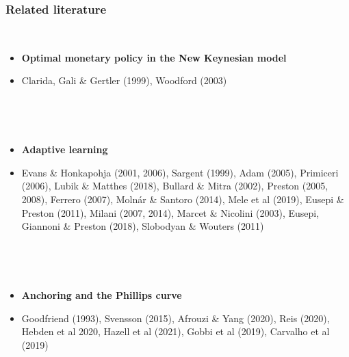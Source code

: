\documentclass[10pt]{beamer}
\begin{document}
\begin{frame}
	\frametitle{Related literature}

\

	\begin{itemize}
		\item \textbf{Optimal monetary policy in the New Keynesian model}
		\item[] Clarida, Gali \& Gertler (1999), Woodford (2003)
		
		\
		
		\
		
		\item \textbf{Adaptive learning}
		\item[] Evans \& Honkapohja (2001, 2006), Sargent (1999), Adam (2005), Primiceri (2006), Lubik \& Matthes (2018), Bullard \& Mitra (2002), Preston (2005, 2008), Ferrero (2007), Moln\'ar \& Santoro (2014), Mele et al (2019), Eusepi \& Preston (2011), Milani (2007, 2014), Marcet \& Nicolini (2003), Eusepi, Giannoni \& Preston (2018),
		Slobodyan \& Wouters (2011) 
		
		
		\
		
		\
		
		\item \textbf{Anchoring and the Phillips curve} 
		\item[] Goodfriend (1993), Svensson (2015), Afrouzi \& Yang (2020), Reis (2020), Hebden et al 2020, Hazell et al (2021), Gobbi et al (2019), Carvalho et al (2019)
		
		\end{itemize}


\end{frame}
\end{document}
